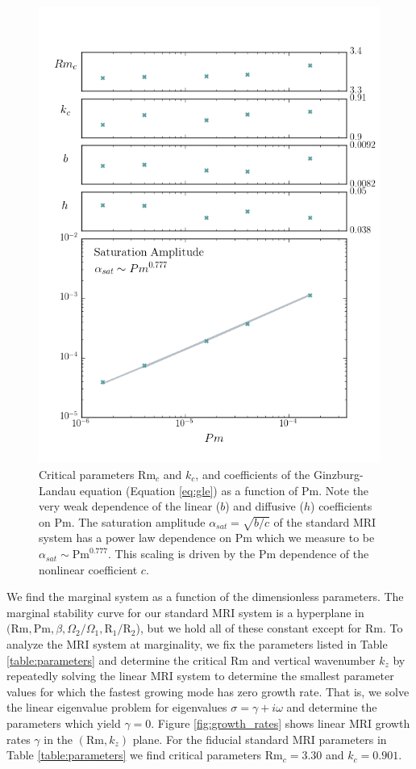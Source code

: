 \documentclass{emulateapj}
\newcommand\reym{\mathrm{Rm}}
\newcommand{\Pm}{\mathrm{Pm}}
\begin{document}
\begin{figure}
\centering
\includegraphics[width=\columnwidth]{../figures/widegap_coeffs_satampscaling_fivepoints.png}
\caption{Critical parameters $\reym_c$ and $k_c$, and coefficients of the Ginzburg-Landau equation (Equation \ref{eq:gle}) as a function of $\Pm$. Note the very weak dependence of the linear ($b$) and diffusive ($h$) coefficients on $\Pm$. The saturation amplitude $\alpha_{sat} = \sqrt{b/c}$ of the standard MRI system has a power law dependence on $\Pm$ which we measure to be $\alpha_{sat} \sim \Pm^{0.777}$. This scaling is driven by the $\Pm$ dependence of the nonlinear coefficient $c$.}\label{fig:coefficients}
\end{figure}

We find the marginal system as a function of the dimensionless parameters. The marginal stability curve for our standard MRI system is a hyperplane in $(\reym, \Pm, \beta, \Omega_2/\Omega_1, \mathrm{R}_1/\mathrm{R}_2$), but we hold all of these constant except for $\reym$. To analyze the MRI system at marginality, we fix the parameters listed in Table \ref{table:parameters} and determine the critical $\reym$ and vertical wavenumber $k_z$ by repeatedly solving the linear MRI system to determine the smallest parameter values for which the fastest growing mode has zero growth rate. That is, we solve the linear eigenvalue problem for eigenvalues $\sigma = \gamma + i \omega$ and determine the parameters which yield $\gamma = 0$. Figure \ref{fig:growth_rates} shows linear MRI growth rates $\gamma$ in the $(\reym, k_z)$ plane. For the fiducial standard MRI parameters in Table \ref{table:parameters} we find critical parameters $\reym_c = 3.30$ and $k_c = 0.901$.
\end{document}
